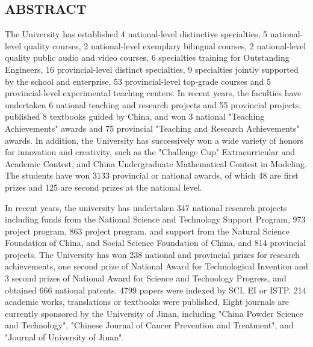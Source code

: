 \begin{ujnabstract*}
\section{ABSTRACT}
The University has established 4 national-level distinctive specialties, 5 national-level quality courses, 2 national-level exemplary bilingual courses, 2 national-level quality public audio and video courses, 6 specialties training for Outstanding Engineers, 16 provincial-level distinct specialties, 9 specialties jointly supported by the school and enterprise, 53 provincial-level top-grade courses and 5 provincial-level experimental teaching centers. In recent years, the faculties have undertaken 6 national teaching and research projects and 55 provincial projects, published 8 textbooks guided by China, and won 3 national "Teaching Achievements" awards and 75 provincial "Teaching and Research Achievements" awards. In addition, the University has successively won a wide variety of honors for innovation and creativity, such as the "Challenge Cup" Extracurricular and Academic Contest, and China Undergraduate Mathematical Contest in Modeling. The students have won 3133 provincial or national awards, of which 48 are first prizes and 125 are second prizes at the national level.

In recent years, the university has undertaken 347 national research projects including funds from the National Science and Technology Support Program, 973 project program, 863 project program, and support from the Natural Science Foundation of China, and Social Science Foundation of China, and 814 provincial projects. The University has won 238 national and provincial prizes for research achievements, one second prize of National Award for Technological Invention and 3 second prizes of National Award for Science and Technology Progress, and obtained 666 national patents. 4799 papers were indexed by SCI, EI or ISTP. 214 academic works, translations or textbooks were published. Eight journals are currently sponsored by the University of Jinan, including "China Powder Science and Technology", "Chinese Journal of Cancer Prevention and Treatment", and "Journal of University of Jinan".
\end{ujnabstract*}
